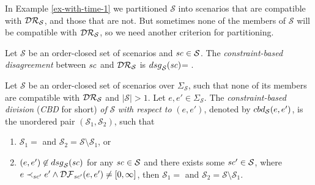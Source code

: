 In Example \ref{ex-with-time-1} we partitioned $\mathcal{S}$ into
scenarios that are compatible with $\mathcal{DR}_{\mathcal{S}}$, and those that
are not. But sometimes none of the members of $\mathcal{S}$ will be
compatible with $\mathcal{DR}_{\mathcal{S}}$, so we need another criterion for
partitioning.
\begin{definition}
\label{def-c-dis}
Let $\mathcal{S}$ be an order-closed set of scenarios and
$\mathit{sc}\in\mathcal{S}$.
The \emph{constraint-based disagreement} between $\mathit{sc}$ and
$\mathcal{DR}_{\mathcal{S}}$
is ${dsg}_{\mathcal{S}}(\mathit{sc})$=
.
\end{definition}
\begin{definition}
\label{def-CBD}
Let $\mathcal{S}$ be an order-closed set of scenarios over
$\Sigma_{\mathcal{S}}$, such that none of its members are compatible
with $\mathcal{DR}_{\mathcal{S}}$ and $|\mathcal{S}|>1$. Let $e,e'\in\Sigma_{\mathcal{S}}$.
The \emph{constraint-based division} (\emph{CBD} for short) \emph{of}
$\mathcal{S}$ \emph{with respect to} $(e,e')$, denoted by
${cbd}_{\mathcal{S}}(e,e')$, is the unordered pair
$(\mathcal{S}_1,\mathcal{S}_2)$, such that
\begin{enumerate}[(1), noitemsep]
  \item
    $\mathcal{S}_1=$
    and
    $\mathcal{S}_2=\mathcal{S}\setminus\mathcal{S}_1$, or
  \item
    $(e,e')\not\in{dsg}_{\mathcal{S}}(\mathit{sc})$ for any
    $\mathit{sc}\in\mathcal{S}$ and there exists some $\mathit{sc}'\in\mathcal{S}$, where
    $e\prec_{\mathit{sc}'}e'\wedge\mathcal{DF}_{\mathit{sc}'}(e,e')\neq[0,\infty]$,
    then
    $\mathcal{S}_1=$ and
     $\mathcal{S}_2=\mathcal{S}\setminus\mathcal{S}_1$.
    \end{enumerate}
\end{definition}
